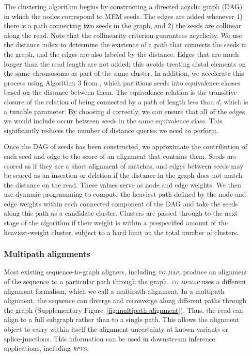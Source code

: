 \documentclass[11pt]{ucthesis}
\newcommand{\tool}[1]{\emph{\textsc{#1}}}
\begin{document}
The clustering algorithm begins by constructing a directed acyclic graph (DAG) in which the nodes correspond to MEM seeds. The edges are added whenever 1) there is a path connecting two seeds in the graph, and 2) the seeds are collinear along the read. Note that the collinearity criterion guarantees acyclicity. We use the distance index to determine the existence of a path that connects the seeds in the graph, and the edges are also labeled by the distance. Edges that are much longer than the read length are not added; this avoids treating distal elements on the same chromosome as part of the same cluster. In addition, we accelerate this process using Algorithm 3 from \cite{chang2020distance}, which partitions seeds into equivalence classes based on the distance between them. The equivalence relation is the transitive closure of the relation of being connected by a path of length less than $d$, which is a tunable parameter. By choosing d correctly, we can ensure that all of the edges we would include occur between seeds in the same equivalence class. This significantly reduces the number of distance queries we need to perform.

Once the DAG of seeds has been constructed, we approximate the contribution of each seed and edge to the score of an alignment that contains them. Seeds are scored as if they are a short alignment of matches, and edges between seeds may be scored as an insertion or deletion if the distance in the graph does not match the distance on the read. These values serve as node and edge weights. We then use dynamic programming to compute the heaviest path defined by the node and edge weights within each connected component of the DAG and take the seeds along this path as a candidate cluster. Clusters are passed through to the next stage of the algorithm if their weight is within a prespecified amount of the heaviest-weight cluster, subject to a hard limit on the total number of clusters.

\subsubsection{Multipath alignments}

Most existing sequence-to-graph aligners, including \tool{vg map}, produce an alignment of the sequence to a particular path through the graph. \tool{vg mpmap} uses a different alignment formalism, which we call a multipath alignment. In a multipath alignment, the sequence can diverge and reconverge along different paths through the graph (Supplementary Figure~\ref{fig:multipath-alignment}). Thus, the read can align to a full subgraph rather than to a single path. This allows the alignment object to carry within itself the alignment uncertainty at known variants or splice-junctions. This information can be used in downstream inference applications, including \tool{rpvg}.
\end{document}
